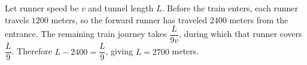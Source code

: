 Let runner speed be $v$ and tunnel length $L$. Before the train enters, each runner travels $1200$ meters, so the forward runner has traveled $2400$ meters from the entrance. The remaining train journey takes $\dfrac{L}{9v}$, during which that runner covers $\dfrac{L}{9}$. Therefore $L-2400=\dfrac{L}{9}$, giving $\boxed{L=2700}$ meters.
